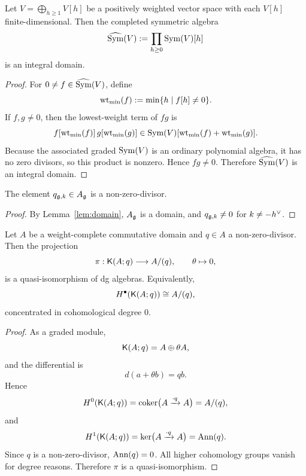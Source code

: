 \begin{lemma}\label{lem:domain}
Let \(V=\bigoplus_{h\ge 1}V[h]\) be a positively weighted vector space with each \(V[h]\) finite-dimensional. Then the completed symmetric algebra
\[
\widehat{\operatorname{Sym}}(V):=\prod_{h\ge 0}\operatorname{Sym}(V)[h]
\]
is an integral domain.
\end{lemma}

\begin{proof}
For \(0\neq f\in \widehat{\operatorname{Sym}}(V)\), define
\[
\operatorname{wt}_{\min}(f):=\min\{h\mid f[h]\neq 0\}.
\]
If \(f,g\neq 0\), then the lowest-weight term of \(fg\) is
\[
f[\operatorname{wt}_{\min}(f)]\,g[\operatorname{wt}_{\min}(g)]\in \operatorname{Sym}(V)[\operatorname{wt}_{\min}(f)+\operatorname{wt}_{\min}(g)].
\]
Because the associated graded \(\operatorname{Sym}(V)\) is an ordinary polynomial algebra, it has no zero divisors, so this product is nonzero. Hence \(fg\neq 0\). Therefore \(\widehat{\operatorname{Sym}}(V)\) is an integral domain.
\end{proof}

\begin{corollary}\label{cor:regularity}
The element \(q_{\mathfrak g,k}\in A_{\mathfrak g}\) is a non-zero-divisor.
\end{corollary}

\begin{proof}
By Lemma~\ref{lem:domain}, \(A_{\mathfrak g}\) is a domain, and \(q_{\mathfrak g,k}\neq 0\) for \(k\neq -h^\vee\).
\end{proof}

\begin{theorem}\label{thm:homology-one-constraint}
Let \(A\) be a weight-complete commutative domain and \(q\in A\) a non-zero-divisor. Then the projection
\[
\pi:\mathsf K(A;q)\longrightarrow A/(q),\qquad \theta\mapsto 0,
\]
is a quasi-isomorphism of dg algebras. Equivalently,
\[
H^\bullet(\mathsf K(A;q))\cong A/(q),
\]
concentrated in cohomological degree \(0\).
\end{theorem}

\begin{proof}
As a graded module,
\[
\mathsf K(A;q)=A\oplus \theta A,
\]
and the differential is
\[
d(a+\theta b)=qb.
\]
Hence
\[
H^0(\mathsf K(A;q))=\operatorname{coker}\bigl(A\xrightarrow{\cdot q}A\bigr)=A/(q),
\]
and
\[
H^1(\mathsf K(A;q))=\ker\bigl(A\xrightarrow{\cdot q}A\bigr)=\operatorname{Ann}(q).
\]
Since \(q\) is a non-zero-divisor, \(\operatorname{Ann}(q)=0\). All higher cohomology groups vanish for degree reasons. Therefore \(\pi\) is a quasi-isomorphism.
\end{proof}

